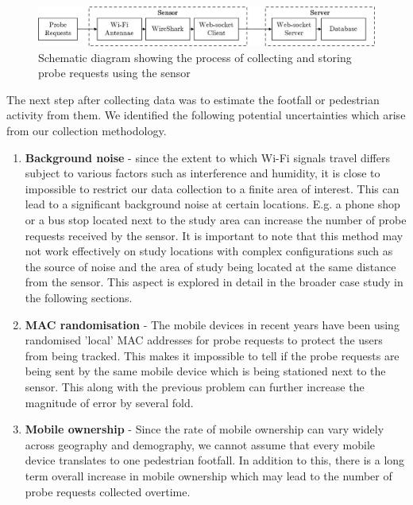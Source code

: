 \begin{figure} 
	\centering \includegraphics[width=\linewidth]
		{images/datacollection_schematic.jpeg}
	\caption 
		{Schematic diagram showing the process of collecting and storing probe
		requests using the sensor}
	\label{datacollection_schematic} 
\end{figure}

The next step after collecting data was to estimate the footfall or pedestrian
activity from them. We identified the following potential uncertainties which
arise from our collection methodology. 

\begin{enumerate} 
\item 
\textbf{Background noise} - since the extent to which Wi-Fi signals travel
		differs subject to various factors such as interference and humidity, it
		is close to impossible to restrict our data collection to a finite area
		of interest. This can lead to a significant background noise at certain
		locations. E.g. a phone shop or a bus stop located next to the study
		area can increase the number of probe requests received by the sensor.
		It is important to note that this method may not work effectively on
		study locations with complex configurations such as the source of noise
		and the area of study being located at the same distance from the
		sensor. This aspect is explored in detail in the broader case study in
		the following sections.
\item 
\textbf{MAC randomisation} - The mobile devices in recent years have been using
		randomised 'local' MAC addresses for probe requests to protect the users
		from being tracked. This makes it impossible to tell if the probe
		requests are being sent by the same mobile device which is being
		stationed next to the sensor. This along with the previous problem can
		further increase the magnitude of error by several fold.
\item
\textbf{Mobile ownership} - Since the rate of mobile ownership can vary widely
		across geography and demography, we cannot assume that every mobile
		device translates to one pedestrian footfall. In addition to this, there
		is a long term overall increase in mobile ownership which may lead to
		the number of probe requests collected overtime.
\end{enumerate}

